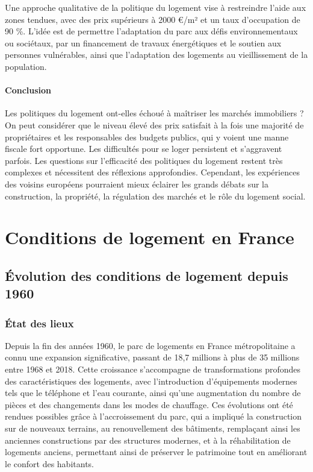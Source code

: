 \documentclass[a4paper, 12pt]{report}
\begin{document}
Une approche qualitative de la politique du logement vise à restreindre l’aide aux zones tendues, avec des prix supérieurs à 2000 €/m² et un taux d’occupation de 90 \%. L’idée est de permettre l’adaptation du parc aux défis environnementaux ou sociétaux, par un financement de travaux énergétiques et le soutien aux personnes vulnérables, ainsi que l’adaptation des logements au vieillissement de la population.

\subsubsection{Conclusion}

Les politiques du logement ont-elles échoué à maîtriser les marchés immobiliers ? On peut considérer que le niveau élevé des prix satisfait à la fois une majorité de propriétaires et les responsables des budgets publics, qui y voient une manne fiscale fort opportune. Les difficultés pour se loger persistent et s'aggravent parfois. Les questions sur l’efficacité des politiques du logement restent très complexes et nécessitent des réflexions approfondies. Cependant, les expériences des voisins européens pourraient mieux éclairer les grands débats sur la construction, la propriété, la régulation des marchés et le rôle du logement social.

\chapter{Conditions de logement en France}

\section{Évolution des conditions de logement depuis 1960}

\subsection{État des lieux}

Depuis la fin des années 1960, le parc de logements en France métropolitaine a connu une expansion significative, passant de 18,7 millions à plus de 35 millions entre 1968 et 2018. Cette croissance s'accompagne de transformations profondes des caractéristiques des logements, avec l'introduction d'équipements modernes tels que le téléphone et l'eau courante, ainsi qu'une augmentation du nombre de pièces et des changements dans les modes de chauffage. Ces évolutions ont été rendues possibles grâce à l'accroissement du parc, qui a impliqué la construction sur de nouveaux terrains, au renouvellement des bâtiments, remplaçant ainsi les anciennes constructions par des structures modernes, et à la réhabilitation de logements anciens, permettant ainsi de préserver le patrimoine tout en améliorant le confort des habitants.
\end{document}
